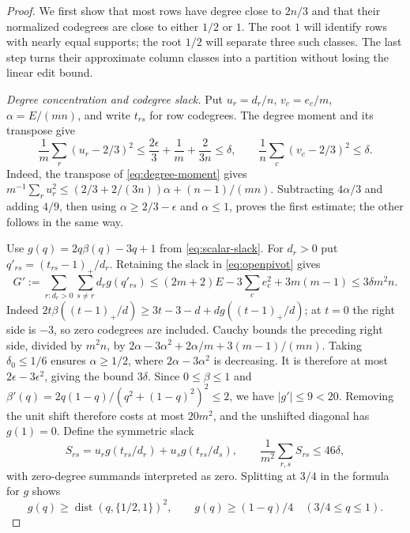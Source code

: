\documentclass[10pt,a4paper]{amsart}
\begin{document}
\begin{proof}
We first show that most rows have degree close to $2n/3$ and that their
normalized codegrees are close to either $1/2$ or $1$. The root $1$
will identify rows with nearly equal supports; the root $1/2$ will
separate three such classes. The last step turns their approximate
column classes into a partition without losing the linear edit bound.

\smallskip\noindent\emph{Degree concentration and codegree slack.}
Put $u_r=d_r/n$, $v_c=e_c/m$, $\alpha=E/(mn)$, and write $t_{rs}$
for row codegrees. The degree moment and its transpose give
\begin{equation}\label{eq:stabilitymoments}
 \frac1m\sum_r(u_r-2/3)^2
 \le\frac{2\epsilon}{3}+\frac1m+\frac{2}{3n}\le\delta,
 \qquad
 \frac1n\sum_c(v_c-2/3)^2\le\delta.
\end{equation}
Indeed, the transpose of \eqref{eq:degree-moment} gives
$m^{-1}\sum_r u_r^2\le(2/3+2/(3n))\alpha+(n-1)/(mn)$.
Subtracting $4\alpha/3$ and adding $4/9$, then using
$\alpha\ge2/3-\epsilon$ and $\alpha\le1$, proves the first estimate;
the other follows in the same way.

Use $g(q)=2q\beta(q)-3q+1$ from \eqref{eq:scalar-slack}.
For $d_r>0$ put $q'_{rs}=(t_{rs}-1)_+/d_r$. Retaining the slack in
\eqref{eq:openpivot} gives
\[
 G':=\sum_{r:d_r>0}\sum_{s\ne r}d_rg(q'_{rs})
 \le(2m+2)E-3\sum_c e_c^2+3m(m-1)
 \le3\delta m^2n.
\]
Indeed $2t\beta((t-1)_+/d)\ge3t-3-d+dg((t-1)_+/d)$;
at $t=0$ the right side is $-3$, so zero codegrees are included.
Cauchy bounds the preceding right side, divided by $m^2n$, by
$2\alpha-3\alpha^2+2\alpha/m+3(m-1)/(mn)$.
Taking $\delta_0\le1/6$ ensures $\alpha\ge1/2$, where
$2\alpha-3\alpha^2$ is decreasing. It is therefore at most
$2\epsilon-3\epsilon^2$, giving the bound $3\delta$.
Since $0\le\beta\le1$ and
$\beta'(q)=2q(1-q)/(q^2+(1-q)^2)^2\le2$, we have $|g'|\le9<20$.
Removing the unit shift therefore costs at most $20m^2$, and the
unshifted diagonal has $g(1)=0$.
Define the symmetric slack
\[
 S_{rs}=u_rg(t_{rs}/d_r)+u_sg(t_{rs}/d_s),
 \qquad \frac1{m^2}\sum_{r,s}S_{rs}\le46\delta,
\]
with zero-degree summands interpreted as zero.
Splitting at $3/4$ in the formula for $g$ shows
\begin{equation}\label{eq:stabilityscalar}
 g(q)\ge\operatorname{dist}(q,\{1/2,1\})^2,
 \qquad g(q)\ge(1-q)/4\quad(3/4\le q\le1).
\end{equation}


\end{proof}
\end{document}
